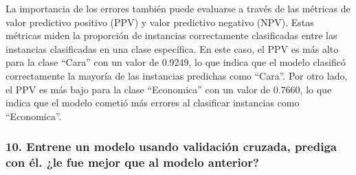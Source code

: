 \documentclass[
]{article}
\begin{document}
La importancia de los errores también puede evaluarse a través de las
métricas de valor predictivo positivo (PPV) y valor predictivo negativo
(NPV). Estas métricas miden la proporción de instancias correctamente
clasificadas entre las instancias clasificadas en una clase específica.
En este caso, el PPV es más alto para la clase ``Cara'' con un valor de
0.9249, lo que indica que el modelo clasificó correctamente la mayoría
de las instancias predichas como ``Cara''. Por otro lado, el PPV es más
bajo para la clase ``Economica'' con un valor de 0.7660, lo que indica
que el modelo cometió más errores al clasificar instancias como
``Economica''.

\hypertarget{entrene-un-modelo-usando-validaciuxf3n-cruzada-prediga-con-uxe9l.-le-fue-mejor-que-al-modelo-anterior}{%
\subsubsection{10. Entrene un modelo usando validación cruzada, prediga
con él. ¿le fue mejor que al modelo
anterior?}\label{entrene-un-modelo-usando-validaciuxf3n-cruzada-prediga-con-uxe9l.-le-fue-mejor-que-al-modelo-anterior}}
\end{document}
